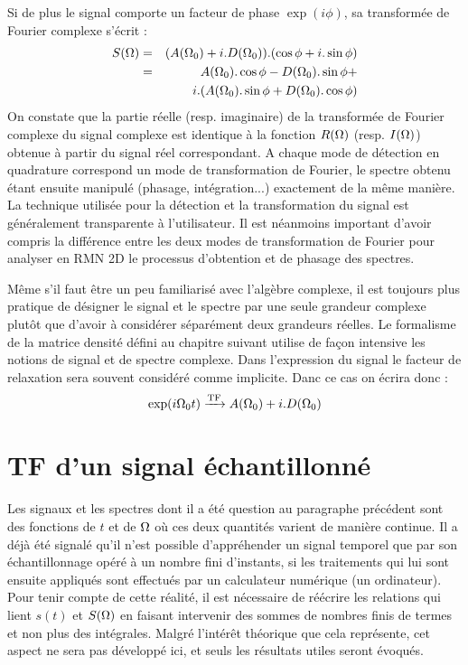 Si de plus le signal comporte un facteur de 
phase $\exp(i\phi)$, sa transformée de Fourier complexe s'écrit :
\begin{eqnarray}
S(\Omega) & = & (A(\Omega_0) + i.D(\Omega_0)).(\cos\phi + i.\sin\phi) \\
& = & A(\Omega_0).\cos\phi - D(\Omega_0).\sin\phi + \\
& & i.(A(\Omega_0).\sin\phi + D(\Omega_0).\cos\phi ) \nonumber
\end{eqnarray}
On constate que la partie réelle (resp. imaginaire) de la transformée de Fourier 
complexe du signal complexe est identique à la fonction $R(\Omega)$ (resp. $I(\Omega)$) 
obtenue à partir du signal réel correspondant. 
A chaque mode de détection en quadrature correspond un mode de transformation de Fourier, 
le spectre obtenu étant ensuite manipulé (phasage, intégration...) exactement de la même manière. 
La technique utilisée pour la détection et la transformation du signal est 
généralement transparente à l'utilisateur. 
Il est néanmoins important d'avoir compris la différence entre les deux 
modes de transformation de Fourier pour analyser en RMN 2D le 
processus d'obtention et de phasage des spectres.

Même s'il faut être un peu familiarisé avec l'algèbre complexe, il est toujours plus 
pratique de désigner le signal et le spectre par une seule grandeur complexe plutôt que 
d'avoir à considérer séparément deux grandeurs réelles. 
Le formalisme de la matrice 
densité défini au chapitre suivant utilise de façon intensive les notions de signal et de spectre 
complexe. 
Dans l'expression du signal le facteur de relaxation sera souvent considéré comme implicite. 
Danc ce cas on écrira donc :
\begin{equation}
\exp(i \Omega_0 t) \xrightarrow{\mathrm{TF}} A(\Omega_0) + i.D(\Omega_0)
\end{equation}

\section{TF d'un signal échantillonné}
Les signaux et les spectres dont il a été question au paragraphe précédent
sont des fonctions de $t$ et de $\Omega$ où ces deux quantités varient
de manière continue.
Il a déjà été signalé qu'il n'est possible d'appréhender un signal temporel
que par son échantillonnage opéré à un nombre fini d'instants, si
les traitements qui lui sont ensuite appliqués sont effectués par un
calculateur numérique (un ordinateur).
Pour tenir compte de cette réalité, il est nécessaire de réécrire les relations
qui lient $s(t)$ et $S(\Omega)$ en faisant intervenir des sommes de nombres finis
de termes et non plus des intégrales.
Malgré l'intérêt théorique que cela représente, cet aspect ne sera pas développé
ici, et seuls les résultats utiles seront évoqués.

